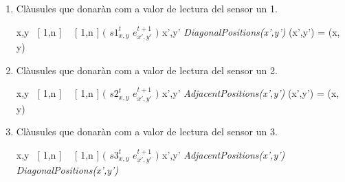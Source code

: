 \documentclass[a4paper,12pt]{article}
\begin{document}
\begin{enumerate}
    \item Clàusules que donaràn com a valor de lectura del sensor un 1.
    \begin{center}
        
        \forall x,y \in \ $[$ 1,n $]$ \ \times \ $[$ 1,n $]$ $($ $s1_{x,y} ^ {t}$ \rightarrow \neg $e_{x',y'} ^ {t+1}$ $)$ \forall x',y' \in \textit{DiagonalPositions(x',y')} \land \forall (x',y') = (x, y)
        
    \end{center}
    
    \item Clàusules que donaràn com a valor de lectura del sensor un 2.
    \begin{center}
        
         \forall x,y \in \ $[$ 1,n $]$ \ \times \ $[$ 1,n $]$ $($ $s2_{x,y} ^ {t}$ \rightarrow \neg $e_{x',y'} ^ {t+1}$ $)$ \forall x',y' \in \textit{AdjacentPositions(x',y')} \land \forall (x',y') = (x, y)
        
    \end{center}
    
    \item Clàusules que donaràn com a valor de lectura del sensor un 3.
    \begin{center}
        
        \forall x,y \in \ $[$ 1,n $]$ \ \times \ $[$ 1,n $]$ $($ $s3_{x,y} ^ {t}$ \rightarrow \neg $e_{x',y'} ^ {t+1}$ $)$  \forall x',y' \in \textit{AdjacentPositions(x',y')} \land \textit{DiagonalPositions(x',y')}
        
    \end{center}
\end{enumerate}
\end{document}
